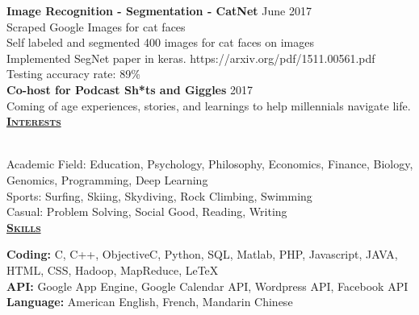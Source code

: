 \documentclass{article}
\newlength{\remaining}
\newcommand{\titleline}[1]{
\setlength{\remaining}{\textwidth-\widthof{\textsc{#1}}}
\noindent\underline{\textsc{#1}\hspace*{\remaining}}\par}
\begin{document}
      \noindent\textbf{Image Recognition - Segmentation - CatNet} \hfill June 2017 \\
      Scraped Google Images for cat faces \\
      Self labeled and segmented 400 images for cat faces on images \\
      Implemented SegNet paper in keras. {https://arxiv.org/pdf/1511.00561.pdf} \\
      Testing accuracy rate: 89\% \\
      
      \noindent\textbf{Co-host for Podcast Sh*ts and Giggles} \hfill 2017 \\
      Coming of age experiences, stories, and learnings to help millennials navigate life. \\
      	
    \titleline{\textbf{\large{Interests}}}
      \\
    Academic Field: Education, Psychology, Philosophy, Economics, Finance, Biology, Genomics, Programming, Deep Learning \\
    Sports: Surfing, Skiing, Skydiving, Rock Climbing, Swimming\\
    Casual: Problem Solving, Social Good, Reading, Writing \\
    
    \titleline{\textbf{\large{Skills}}}
       \noindent\textbf{Coding:} C, C++, ObjectiveC, Python, SQL, Matlab, PHP, Javascript, JAVA, HTML, CSS, Hadoop, MapReduce, LeTeX \\
       \noindent\textbf{API:} Google App Engine, Google Calendar API, Wordpress API, Facebook API \\
       \noindent\textbf{Language:} American English, French, Mandarin Chinese
\end{document}
